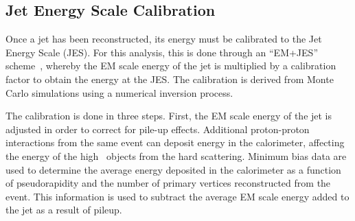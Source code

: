 \subsection{Jet Energy Scale Calibration}
\label{section_JES}
%
%
Once a jet has been reconstructed, its energy must be calibrated to the Jet Energy Scale (JES). For this analysis, this is done  through an ``EM+JES'' scheme~\cite{JES_pub}, whereby the EM scale energy of the jet is multiplied by a calibration factor to obtain the energy at the JES. The calibration is derived from Monte Carlo simulations using a numerical inversion process.  %

The calibration is done in three steps. First, the EM scale energy of the jet is adjusted in order to correct for pile-up effects. Additional proton-proton interactions from the same event can deposit energy in the calorimeter, affecting the energy of the high \pt~objects from the hard scattering. Minimum bias data are used to determine the average energy deposited in the calorimeter as a function of pseudorapidity and the number of primary vertices reconstructed from the event. This information is used to subtract the average EM scale energy added to the jet as a result of pileup.


